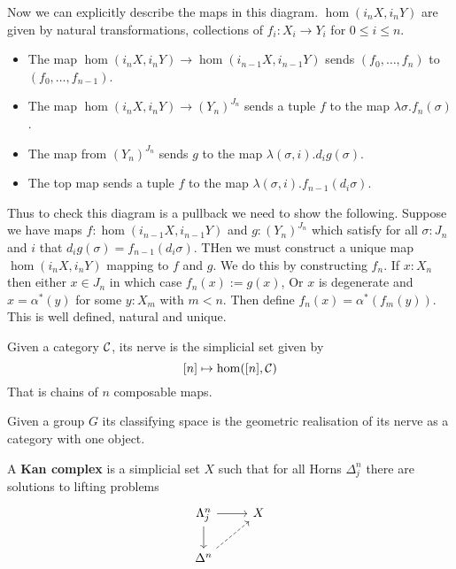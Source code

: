 \begin{exercise}
    Now we can explicitly describe the maps in this diagram.
    $\hom(i_n X, i_n Y)$ are given by natural transformations, collections of $f_i : X_i \to Y_i$ for $0 \leq i \leq n$.
    \begin{itemize}
        \item The map $\hom(i_n X, i_n Y) \to \hom(i_{n-1} X, i_{n-1} Y)$ sends $(f_0, \ldots, f_n)$ to $(f_0, \ldots, f_{n-1})$.
        \item The map $\hom(i_n X, i_n Y) \to (Y_n)^{J_n}$ sends a tuple $f$ to the map $\lambda \sigma . f_n(\sigma)$.
        \item The map from $(Y_n)^{J_n}$ sends $g$ to the map $\lambda (\sigma, i). d_i g(\sigma)$.
        \item The top map sends a tuple $f$ to the map $\lambda (\sigma, i) . f_{n-1}(d_i \sigma)$. 
    \end{itemize}
    Thus to check this diagram is a pullback we need to show the following.
    Suppose we have maps $f : \hom(i_{n-1} X , i_{n-1} Y)$ and $g : (Y_n)^{J_n}$ which satisfy for all $\sigma : J_n$ and $i$ that $d_i g(\sigma) = f_{n-1}(d_i \sigma)$.
    THen we must construct a unique map $\hom(i_n X, i_n Y)$ mapping to $f$ and $g$.
    We do this by constructing $f_n$.
    If $x : X_n$ then either $x \in J_n$ in which case $f_n(x) := g(x)$,
    Or $x$ is degenerate and $x = \alpha^*(y)$ for some $y : X_m$ with $m < n$.
    Then define $f_n(x) = \alpha^*(f_m(y))$.
    This is well defined, natural and unique.
\end{exercise}


\begin{definition}
    Given a category $\mathcal{C}$, its nerve is the simplicial set given by 
    \[ [n] \mapsto \hom([n], \mathcal{C}) \]
    That is chains of $n$ composable maps.
\end{definition}

\begin{definition}
    Given a group $G$ its classifying space is the geometric realisation of its nerve as a category with one object.
\end{definition}

\begin{definition}
    A \textbf{Kan complex} is a simplicial set $X$ such that for all Horns $\Delta^n_j$ there are solutions to lifting problems
    \[\begin{tikzcd}
        \Lambda^n_j \ar[d] \ar[r] & X \\
        \Delta^n \ar[ur, dashed]
    \end{tikzcd}\]
\end{definition}

